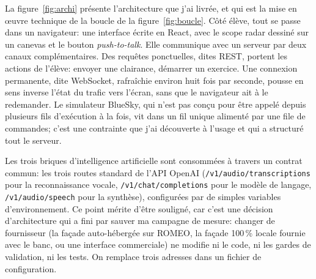 \documentclass[11pt,a4paper]{article}
\begin{document}
La figure~\ref{fig:archi} présente l'architecture que j'ai livrée, et qui est la mise en \oe uvre technique de la boucle de la figure~\ref{fig:boucle}. Côté élève, tout se passe dans un navigateur: une interface écrite en React, avec le scope radar dessiné sur un canevas et le bouton \emph{push-to-talk}. Elle communique avec un serveur par deux canaux complémentaires. Des requêtes ponctuelles, dites REST, portent les actions de l'élève: envoyer une clairance, démarrer un exercice. Une connexion permanente, dite WebSocket, rafraîchie environ huit fois par seconde, pousse en sens inverse l'état du trafic vers l'écran, sans que le navigateur ait à le redemander. Le simulateur BlueSky, qui n'est pas conçu pour être appelé depuis plusieurs fils d'exécution à la fois, vit dans un fil unique alimenté par une file de commandes; c'est une contrainte que j'ai découverte à l'usage et qui a structuré tout le serveur. 

Les trois briques d'intelligence artificielle sont consommées à travers un contrat commun: les trois routes standard de l'API OpenAI (\texttt{/v1/audio/transcriptions} pour la reconnaissance vocale, \texttt{/v1/chat/completions} pour le modèle de langage, \texttt{/v1/audio/speech} pour la synthèse), configurées par de simples variables d'environnement. Ce point mérite d'être souligné, car c'est une décision d'architecture qui a fini par sauver ma campagne de mesure: changer de fournisseur (la façade auto-hébergée sur ROMEO, la façade 100\,\% locale fournie avec le banc, ou une interface commerciale) ne modifie ni le code, ni les gardes de validation, ni les tests. On remplace trois adresses dans un fichier de configuration. 
\end{document}
